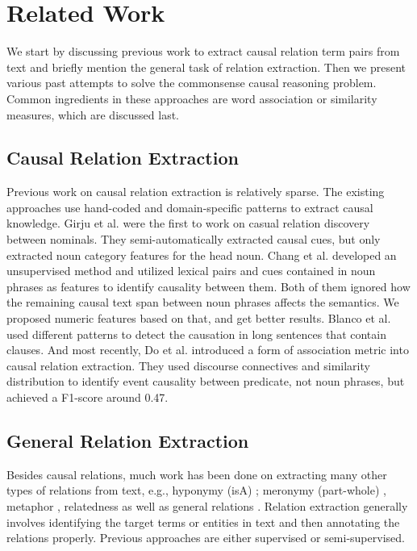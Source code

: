 \section{Related Work}
\label{sec:related}

We start by discussing previous work to extract causal relation term
pairs from text and briefly mention the general task of relation
extraction. Then we present various past attempts to solve the
commonsense causal reasoning problem. Common ingredients in these
approaches are word association or similarity measures, which are
discussed last.

\subsection{Causal Relation Extraction}
Previous work on causal relation extraction is relatively sparse.
The existing approaches use hand-coded and domain-specific patterns
to extract causal knowledge. Girju et al. \cite{girju2003automatic}
were the first to work on casual relation discovery between
nominals. They semi-automatically extracted causal cues, but only
extracted noun category features for the head noun. Chang et al.
\cite{ChangC04} developed an unsupervised method and
utilized lexical pairs and cues contained in noun phrases as
features to identify causality between them. Both of them ignored
how the remaining causal text span between noun phrases
affects the semantics. We proposed numeric features based on that,
and get better results. Blanco et al. \cite{blanco2008causal} used
different patterns to detect the causation in long sentences that
contain clauses. And most recently, Do et al. \cite{do2011minimally}
introduced a form of association metric into causal relation
extraction. They used discourse connectives and similarity
distribution to identify event causality between predicate, not noun
phrases, but achieved a F1-score around 0.47.

\subsection{General Relation Extraction}
Besides causal relations, much work has been done on extracting many
other types of relations from text, e.g., hyponymy (isA)
\cite{Etzioni:Web,12MSRA:Probase}; meronymy (part-whole)
\cite{GirjuBM06}, metaphor \cite{LiZW13}, relatedness
\cite{Zhang15:Assoc} as well as general relations
\cite{Banko:TextRunner,S:YAGO,S:YAGO2,fader2011identifying,NakasholeWS12}.
Relation extraction generally involves identifying the target terms
or entities in text and then annotating the relations properly.
Previous approaches are either supervised or semi-supervised.

